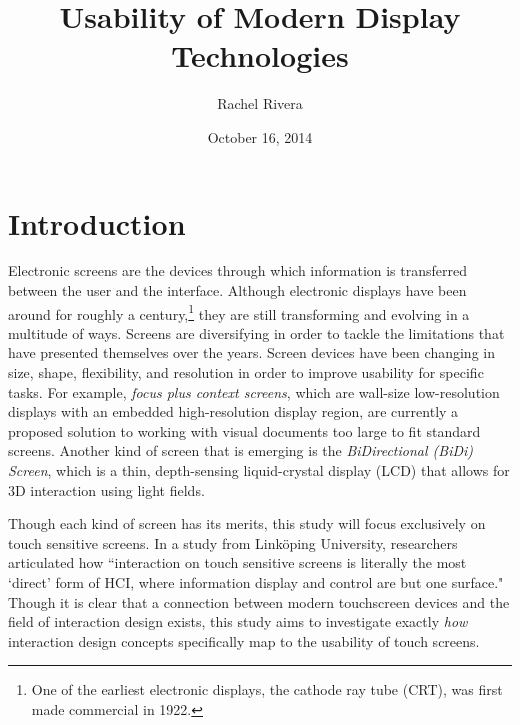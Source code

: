 \documentclass{article}
\title{Usability of Modern Display Technologies}
\author{Rachel Rivera}
\date{October 16, 2014}
\begin{document}
\maketitle


\pagebreak
\tableofcontents


\pagebreak

%
%
\section{Introduction}
\label{introduction}

Electronic screens are the devices through which information is transferred between the user and the interface. Although electronic displays have been around for roughly a century,\footnote{One of the earliest electronic displays, the cathode ray tube (CRT),  was first made commercial in 1922.\cite{Cathode}} they are still transforming and evolving in a multitude of ways. Screens are diversifying in order to tackle the limitations that have presented themselves over the years.\cite{Eisenberg} Screen devices have been changing in size, shape, flexibility, and resolution in order to improve usability for specific tasks. For example, \textit{focus plus context screens}, which are wall-size low-resolution displays with an embedded high-resolution display region, are currently a proposed solution to working with visual documents too large to fit standard screens.\cite{Baudisch} Another kind of screen that is emerging is the \textit{BiDirectional (BiDi) Screen}, which is a thin, depth-sensing liquid-crystal display (LCD) that allows for 3D interaction using light fields.\cite{Hirsch} 

 Though each kind of screen has its merits, this study will focus exclusively on touch sensitive screens. In a study from Link\"{o}ping University, researchers articulated how ``interaction on touch sensitive screens is literally the most `direct' form of HCI, where information display and control are but one surface."\cite{Albinsson} Though it is clear that a connection between modern touchscreen devices and the field of interaction design exists, this study aims to investigate exactly \textit{how} interaction design concepts specifically map to the usability of touch screens. 
\end{document}
